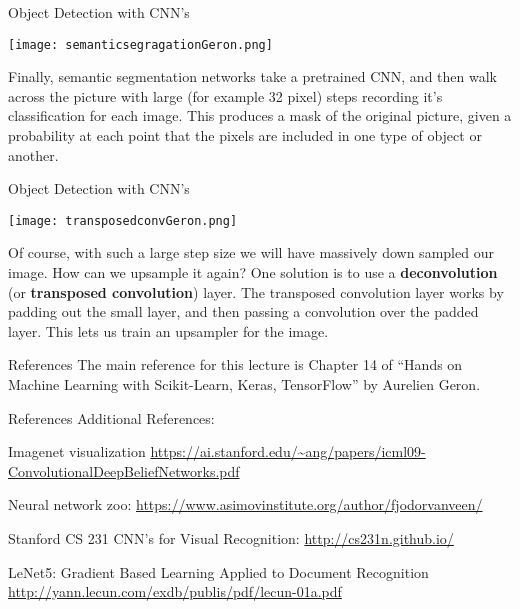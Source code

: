 \documentclass[10pt, table, dvipsnames,xcdraw, handout]{beamer}
\begin{document}
\begin{frame}[fragile]{Object Detection with CNN's}
  \begin{minipage}[t][0.4\textheight][t]{\textwidth}\centering
	\centering \texttt{[image: semanticsegragationGeron.png]}
  \end{minipage}
  \vfill
\begin{minipage}[t][0.6\textheight][t]{\textwidth}
Finally, semantic segmentation networks take a pretrained CNN, and then walk across the picture with large (for example 32 pixel) steps recording it's classification for each image. This produces a mask of the original picture, given a probability at each point that the pixels are included in one type of object or another. 
\end{minipage}
\end{frame}




\begin{frame}[fragile]{Object Detection with CNN's}
  \begin{minipage}[t][0.4\textheight][t]{\textwidth}\centering
	\centering \texttt{[image: transposedconvGeron.png]}
  \end{minipage}
  \vfill
\begin{minipage}[t][0.6\textheight][t]{\textwidth}
Of course, with such a large step size we will have massively down sampled our image. How can we upsample it again? One solution is to use a \textbf{deconvolution} (or \textbf{transposed convolution}) layer. The transposed convolution layer works by padding out the small layer, and then passing a convolution over the padded layer. This lets us train an upsampler for the image. 
\end{minipage}
\end{frame}







\begin{frame}[fragile]{References}
The main reference for this lecture is Chapter 14 of ``Hands on Machine Learning with Scikit-Learn, Keras, TensorFlow'' by Aurelien Geron. 

\end{frame}




\begin{frame}[fragile]{References}
Additional References:

Imagenet visualization
\url{https://ai.stanford.edu/~ang/papers/icml09-ConvolutionalDeepBeliefNetworks.pdf}

Neural network zoo: \url{https://www.asimovinstitute.org/author/fjodorvanveen/}

Stanford CS 231 CNN's for Visual Recognition: \url{http://cs231n.github.io/}

LeNet5: Gradient Based Learning Applied to Document Recognition \url{http://yann.lecun.com/exdb/publis/pdf/lecun-01a.pdf}



\end{frame}
\end{document}
